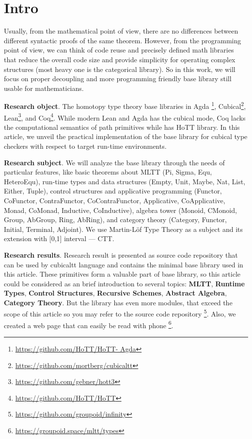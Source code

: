 \documentclass{article}
\begin{document}
\newpage
\tableofcontents

\newpage
\section{Intro}

Usually, from the mathematical point of view, there are no differences between
different syntactic proofs of the same theorem. However, from the programming point of view, we can think of code reuse and precisely defined math libraries that reduce
the overall code size and provide simplicity for operating complex
structures (most heavy one is the categorical library). So in this work, we will focus
on proper decoupling and more programming friendly base library still usable
for mathematicians.

{\bf Research object}. The homotopy type theory base libraries in
Agda \footnote{\url{https://github.com/HoTT/HoTT- Agda}},
Cubical\footnote{\url{https://github.com/mortberg/cubicaltt}},
Lean\footnote{\url{ https://github.com/gebner/hott3}}, and
Coq\footnote{\url{https://github.com/HoTT/HoTT}}.
While modern Lean and Agda has the cubical mode, Coq lacks the computational semantics of path primitives
while has HoTT library. In this article, we unveil the practical implementation of the
base library for cubical type checkers with respect to target run-time environments.

{\bf Research subject}. We will analyze the base library through the needs of particular features,
like basic theorems about MLTT (Pi, Sigma, Equ, HeteroEqu), run-time types and data
structures (Empty, Unit, Maybe, Nat, List, Either, Tuple), control structures and applicative programming
(Functor, CoFunctor, ContraFunctor, CoContraFunctor, Applicative, CoApplicative, Monad,
CoMonad, Inductive, CoInductive), algebra tower (Monoid, CMonoid, Group, AbGroup, Ring, AbRing),
and category theory (Category, Functor, Initial, Terminal, Adjoint).
We use Martin-Löf Type Theory as a subject and its extension with [0,1] interval --- CTT.

{\bf Research results}. Research result is presented as source code repository that can be used by
cubicaltt language and contains the minimal base library used in this article.
These primitives form a valuable part of base library, so this article could be
considered as an brief introduction to several topics: {\bf MLTT}, {\bf Runtime Types},
{\bf Control Structures},  {\bf Recursive Schemes},
{\bf Abstract Algebra}, {\bf Category Theory}.
But the library has even more modules, that
exceed the scope of this article so you may refer to the source code
repository \footnote{\url{https://github.com/groupoid/infinity}}.
Also, we created a web page that can easily be read with phone \footnote{\url{https://groupoid.space/mltt/types}}.
\end{document}
